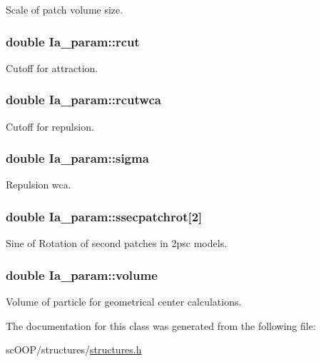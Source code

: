 Scale of patch volume size. 

\hypertarget{class_ia__param_abd72fc915c8c5d7c1786c765e808bcd4}{
\subsubsection[{rcut}]{\setlength{\rightskip}{0pt plus 5cm}double Ia\+\_\+param\+::rcut}}\label{class_ia__param_abd72fc915c8c5d7c1786c765e808bcd4}


Cutoff for attraction. 

\hypertarget{class_ia__param_a9a7d011fda48b10b3f6c005eddb433e4}{
\subsubsection[{rcutwca}]{\setlength{\rightskip}{0pt plus 5cm}double Ia\+\_\+param\+::rcutwca}}\label{class_ia__param_a9a7d011fda48b10b3f6c005eddb433e4}


Cutoff for repulsion. 

\hypertarget{class_ia__param_aafb540d04d54bd58140378a84f94b81d}{
\subsubsection[{sigma}]{\setlength{\rightskip}{0pt plus 5cm}double Ia\+\_\+param\+::sigma}}\label{class_ia__param_aafb540d04d54bd58140378a84f94b81d}


Repulsion wca. 

\hypertarget{class_ia__param_a14afc5f0a2e7842923345b3724e329f2}{
\subsubsection[{ssecpatchrot}]{\setlength{\rightskip}{0pt plus 5cm}double Ia\+\_\+param\+::ssecpatchrot\mbox{[}2\mbox{]}}}\label{class_ia__param_a14afc5f0a2e7842923345b3724e329f2}


Sine of Rotation of second patches in 2psc models. 

\hypertarget{class_ia__param_af19168047d88497117c70ff6672df1bf}{
\subsubsection[{volume}]{\setlength{\rightskip}{0pt plus 5cm}double Ia\+\_\+param\+::volume}}\label{class_ia__param_af19168047d88497117c70ff6672df1bf}


Volume of particle for geometrical center calculations. 



The documentation for this class was generated from the following file\+:\begin{DoxyCompactItemize}
\item 
sc\+O\+O\+P/structures/\hyperlink{structures_8h}{structures.\+h}\end{DoxyCompactItemize}
